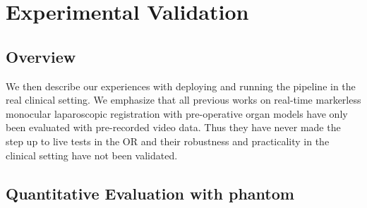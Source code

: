 \section{Experimental Validation}
\label{sec:experiments}
\subsection{Overview}
We then describe our experiences with deploying and running the pipeline in the real clinical setting.
We emphasize that all previous works on real-time markerless monocular laparoscopic registration with pre-operative organ models have only been evaluated with pre-recorded video data.
Thus they have never made the step up to live tests in the OR and their robustness and practicality in the clinical setting have not been validated.

\subsection{Quantitative Evaluation with phantom}
\label{subsec:quantitative-evaluation-with-phantom}

\newlength\imagewidth
\newlength\imagescale

